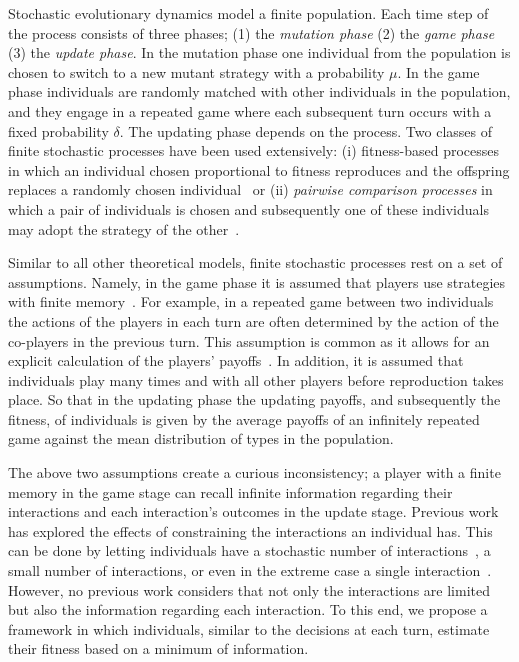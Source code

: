 \documentclass[11pt]{article}
\theoremstyle{plainCl1}
\theoremstyle{plainCl2}
\begin{document}
Stochastic evolutionary dynamics model a finite population. Each
time step of the process consists of three phases; (1) the \textit{mutation
phase} (2) the \textit{game phase} (3) the \textit{update phase}. In the
mutation phase one individual from the population is chosen to switch to a new
mutant strategy with a probability \(\mu\). In the game phase individuals are
randomly matched with other individuals in the population, and they engage in a
repeated game where each subsequent turn occurs with a fixed probability
\(\delta\). The updating phase depends on the process. Two classes of
finite stochastic processes have been used extensively: (i) fitness-based
processes in which an individual chosen proportional to fitness reproduces and
the offspring replaces a randomly chosen individual~\cite{nowak:Nature:2004} or
(ii) \textit{pairwise comparison processes} in which a pair of individuals is
chosen and subsequently one of these individuals may adopt the strategy of the
other~\cite{traulsen2007pairwise}.

Similar to all other theoretical models, finite stochastic processes rest on a
set of assumptions. Namely, in the game phase it is assumed that players use
strategies with finite memory~\cite{Nowak1992tit, Baek2016}. For example, in a
repeated game between two individuals the actions of the players in each turn
are often determined by the action of the co-players in the previous turn. This
assumption is common as it allows for an explicit calculation of the players'
payoffs~\cite{sigmund2010calculus}. In addition, it is
assumed that individuals play many times and with all other players before
reproduction takes place. So that in the updating phase the updating payoffs, and
subsequently the fitness, of individuals is given by the average payoffs of an
infinitely repeated game against the mean distribution of types in the
population.

The above two assumptions create a curious inconsistency; a player with a finite
memory in the game stage can recall infinite information regarding their
interactions and each interaction's outcomes in the update stage. Previous work
has explored the effects of constraining the interactions an individual has.
This can be done by letting individuals have a stochastic number of
interactions~\cite{roca:PhysicalReview:2006, sanchez:JTB:2005,
Traulsen:JTB:2007}, a small number of interactions, or even in the extreme case
a single interaction~\cite{Woelfing:JTB:2009}. However, no previous work
considers that not only the interactions are limited but also the information
regarding each interaction. To this end, we propose a framework in which
individuals, similar to the decisions at each turn, estimate their fitness based
on a minimum of information.
\end{document}
